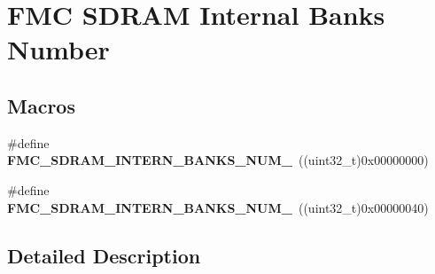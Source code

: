\hypertarget{group___f_m_c___s_d_r_a_m___internal___banks___number}{}\section{F\+MC S\+D\+R\+AM Internal Banks Number}
\label{group___f_m_c___s_d_r_a_m___internal___banks___number}
\subsection*{Macros}
\begin{DoxyCompactItemize}
\item 
\#define {\bfseries F\+M\+C\+\_\+\+S\+D\+R\+A\+M\+\_\+\+I\+N\+T\+E\+R\+N\+\_\+\+B\+A\+N\+K\+S\+\_\+\+N\+U\+M\+\_}~((uint32\+\_\+t)0x00000000)\hypertarget{group___f_m_c___s_d_r_a_m___internal___banks___number_ga0adbd4c172efd2a3cf66dd6274f901c4}{}\label{group___f_m_c___s_d_r_a_m___internal___banks___number_ga0adbd4c172efd2a3cf66dd6274f901c4}

\item 
\#define {\bfseries F\+M\+C\+\_\+\+S\+D\+R\+A\+M\+\_\+\+I\+N\+T\+E\+R\+N\+\_\+\+B\+A\+N\+K\+S\+\_\+\+N\+U\+M\+\_}~((uint32\+\_\+t)0x00000040)\hypertarget{group___f_m_c___s_d_r_a_m___internal___banks___number_gaa7eda2b73174811f3a8a00ad924b020e}{}\label{group___f_m_c___s_d_r_a_m___internal___banks___number_gaa7eda2b73174811f3a8a00ad924b020e}

\end{DoxyCompactItemize}


\subsection{Detailed Description}
